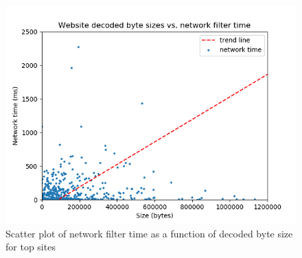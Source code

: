 \begin{figure}[h]
	\includegraphics[scale=0.5]{results/byte_size_vs_filter_time}
	\caption{Scatter plot of network filter time as a function of decoded byte size for top sites}
	\label{fig:network_filter_decoded_size}
\end{figure}

